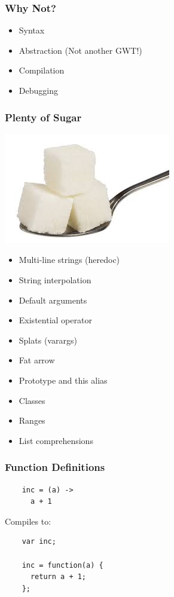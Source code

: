 \documentclass{beamer}
\begin{document}
\begin{frame}
  \frametitle{Why Not?}
  \begin{itemize}
    \pause
    \item Syntax
    \pause
    \item Abstraction (Not another GWT!)
    \pause
    \item Compilation
    \pause
    \item Debugging
      \pause
  \end{itemize}
\end{frame}



\begin{frame}
  \frametitle{Plenty of Sugar}
  \includegraphics[scale=.40]{sugar}
%
%
  \begin{multicols}{2}
  \begin{itemize}
    \item Multi-line strings (heredoc)
    \item String interpolation
    \item Default arguments
    \item Existential operator
    \item Splats (varargs)
    \item Fat arrow
    \item Prototype and this alias
    \item Classes
    \item Ranges
    \item List comprehensions
  \end{itemize}
  \end{multicols}
\end{frame}

\begin{frame}[fragile]
  \frametitle{Function Definitions}

  \begin{verbatim}
    inc = (a) ->
      a + 1
  \end{verbatim}

  \pause
  \vspace{.5cm}
  Compiles to:
  \vspace{.5cm}

  \begin{verbatim}
    var inc;

    inc = function(a) {
      return a + 1;
    };    
  \end{verbatim}  
\end{frame}
\end{document}
